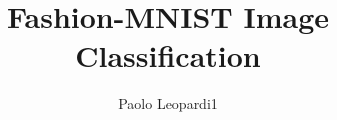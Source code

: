 \documentclass[letterpaper, 10 pt, journal, twoside]{IEEEtran}
\begin{document}
\title{Fashion-MNIST Image Classification}


\author{Paolo Leopardi1}


\maketitle


\IEEEpeerreviewmaketitle








\end{document}
